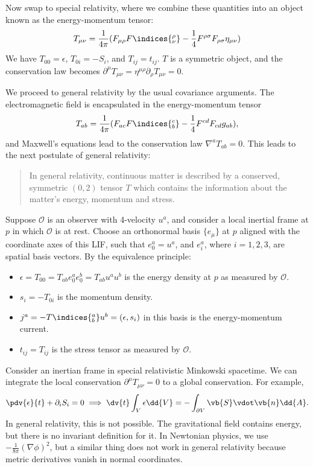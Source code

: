 \documentclass{jknotes}
\begin{document}
Now swap to special relativity, where we combine these quantities into an object known as the energy-momentum tensor:
\begin{equation}
    T_{\mu\nu} = \frac1{4\pi} (F_{\mu\rho}F\indices{_\nu^\rho} - \frac14 F^{\rho\sigma}F_{\rho\sigma}\eta_{\mu\nu})
\end{equation}
We have \(T_{00} =\epsilon\), \(T_{0i} = -S_i\), and \(T_{ij} = t_{ij}\). \(T\) is a symmetric object, and the conservation law becomes \(\partial^\mu T_{\mu\nu} = \eta^{\mu\rho}\partial_\rho T_{\mu\nu} = 0\).

We proceed to general relativity by the usual covariance arguments. The electromagnetic field is encapsulated in the energy-momentum tensor
\begin{equation}
    T_{ab} = \frac1{4\pi}(F_{ac}F\indices{_b^c} - \frac14F^{cd}F_{cd} g_{ab}),
\end{equation}
and Maxwell's equations lead to the conservation law \(\nabla^a T_{ab}=0\). This leads to the next postulate of general relativity:
\begin{quote}
    In general relativity, continuous matter is described by a conserved, symmetric \((0,2)\) tensor \(T\) which contains the information about the matter's energy, momentum and stress.
\end{quote}

Suppose \(\mathcal{O}\) is an observer with 4-velocity \(u^a\), and consider a local inertial frame at \(p\) in which \(\mathcal{O}\) is at rest. Choose an orthonormal basis \(\{e_\mu\}\) at \(p\) aligned with the coordinate axes of this LIF, such that \(e_0^a = u^a\), and \(e_i^a\), where \(i=1,2,3\), are spatial basis vectors. By the equivalence principle:
\begin{itemize}
    \item \(\epsilon = T_{00} = T_{ab}e^a_0e^b_0 = T_{ab}u^au^b\) is the energy density at \(p\) as measured by \(\mathcal{O}\).
    \item \(s_i = -T_{0i}\) is the momentum density.
    \item \(j^a = -T\indices{^a_b}u^b = (\epsilon,s_i)\) in this basis is the energy-momentum current.
    \item \(t_{ij} = T_{ij}\) is the stress tensor as measured by \(\mathcal{O}\).
\end{itemize}

Consider an inertian frame in special relativistic Minkowski spacetime. We can integrate the local conservation \(\partial^\mu T_{\mu\nu}=0\) to a global conservation. For example,
\begin{equation}
    \pdv{\epsilon}{t} + \partial_i S_i = 0 \implies \dv{t}\int_V\epsilon\dd{V} = -\int_{\partial V} \vb{S}\vdot\vb{n}\dd{A}.
\end{equation}
In general relativity, this is not possible. The gravitational field contains energy, but there is no invariant definition for it. In Newtonian physics, we use \(-\frac1{8\pi}(\nabla\phi)^2\), but a similar thing does not work in general relativity because metric derivatives vanish in normal coordinates.
\end{document}
